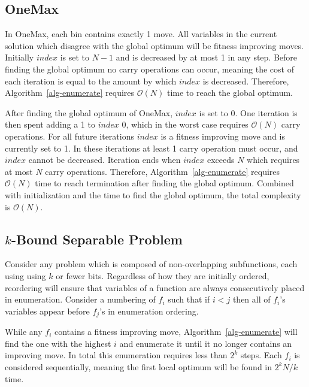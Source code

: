 \documentclass[runningheads,a4paper]{llncs}
\newcommand{\BigO}[1]{$\mathcal{O}{(#1)}$}
\begin{document}
\subsection{OneMax}
In OneMax, each bin contains exactly 1 move. All variables in the current solution
which disagree with the global optimum will be fitness improving moves.
Initially $index$ is set to $N-1$ and is decreased by at most 1 in any step.
Before finding the global optimum no carry operations can occur, meaning the
cost of each iteration is equal to the amount by which $index$ is decreased.
Therefore, Algorithm~\ref{alg-enumerate} requires \BigO{N} time to reach
the global optimum.

After finding the global optimum of OneMax, $index$ is set to 0. One iteration
is then spent adding a 1 to $index$ 0, which in the worst case requires \BigO{N}
carry operations. For all future iterations $index$ is a fitness improving move
and is currently set to 1. In these iterations at least 1 carry operation must
occur, and $index$ cannot be decreased. Iteration ends when $index$ exceeds $N$
which requires at most $N$ carry operations. Therefore, Algorithm~\ref{alg-enumerate}
requires \BigO{N} time to reach termination after finding the global optimum. Combined
with initialization and the time to find the global optimum, the total complexity is \BigO{N}.

\subsection{$k$-Bound Separable Problem}
Consider any problem which is composed of non-overlapping
subfunctions, each using using $k$ or fewer bits. Regardless
of how they are initially ordered, reordering will ensure that
variables of a function are always consecutively placed in enumeration.
Consider a numbering of $f_i$ such that if $i < j$ then all of $f_i$'s
variables appear before $f_j$'s in enumeration ordering.

While any $f_i$ contains a fitness improving move, Algorithm~\ref{alg-enumerate}
will find the one with the highest $i$ and enumerate it until it no longer
contains an improving move. In total this enumeration requires less than $2^k$
steps. Each $f_i$ is considered sequentially, meaning the first local optimum
will be found in $2^kN/k$ time.
\end{document}

